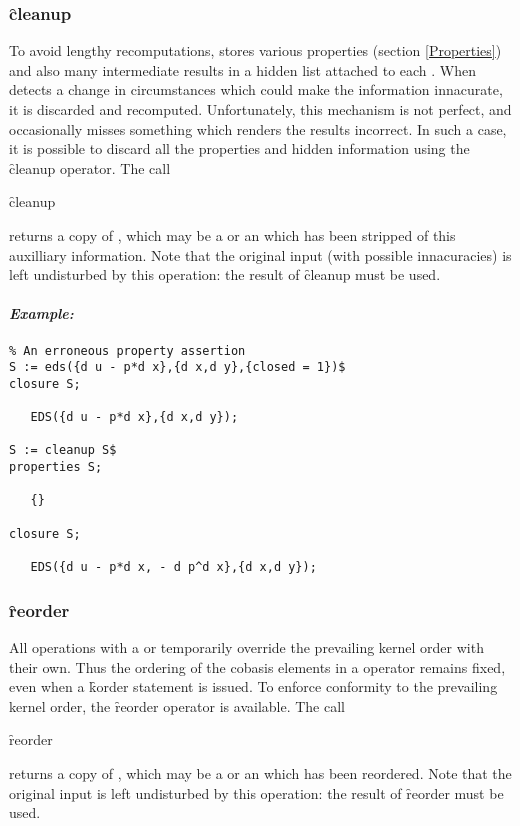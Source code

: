 \subsubsection{\f{cleanup}}
\label{cleanup}

\hypertarget{operator:CLEANUP}{}
To avoid lengthy recomputations,  stores various properties (section
\ref{Properties}) and also many intermediate results in a hidden list
attached to each . When  detects a change in circumstances
which could make the information innacurate, it is discarded and
recomputed. Unfortunately, this mechanism is not perfect, and occasionally
misses something which renders the results incorrect. In such a case, it is
possible to discard all the properties and hidden information using the
\f{cleanup} operator. The call
\begin{syntax}
	\f{cleanup} 
\end{syntax}
returns a copy of , which may be a  or an
 which has been stripped of this auxilliary information. Note
that the original input (with possible innacuracies) is left undisturbed by
this operation: the result of \f{cleanup} must be used.

\paragraph{\textit{Example:}}
\begin{verbatim}
% An erroneous property assertion
S := eds({d u - p*d x},{d x,d y},{closed = 1})$
closure S;

   EDS({d u - p*d x},{d x,d y});

S := cleanup S$
properties S;

   {}

closure S;

   EDS({d u - p*d x, - d p^d x},{d x,d y});
\end{verbatim}

\subsubsection{\f{reorder}}
\label{reorder}

\hypertarget{operator:EDS_REORDER}{}
All operations with a  or  temporarily override
the prevailing kernel order with their own. Thus the ordering of the
cobasis elements in a  operator remains fixed, even when a
\REDUCE \f{korder} statement is issued. To enforce conformity to the
prevailing kernel order, the \f{reorder} operator is available. The call
\begin{syntax}
	\f{reorder} 
\end{syntax}
returns a copy of , which may be a  or an
 which has been reordered. Note that the original input is left
undisturbed by this operation: the result of \f{reorder} must be used.

